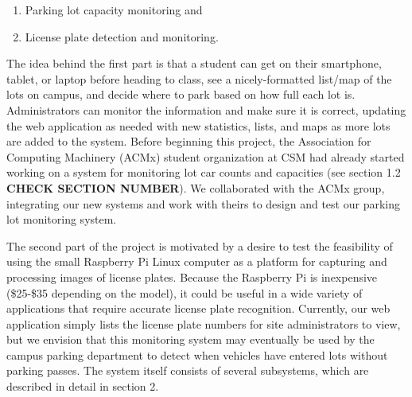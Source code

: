 \documentclass[11pt, oneside, fullpage, doublespace]{article}
\begin{document}
\begin{enumerate}
\item Parking lot capacity monitoring and
\item License plate detection and monitoring.
\end{enumerate}

The idea behind the first part is that a student can get on their smartphone, tablet, or laptop before heading to class, see a nicely-formatted list/map of the lots on campus, and decide where to park based on how full each lot is. Administrators can monitor the information and make sure it is correct, updating the web application as needed with new statistics, lists, and maps as more lots are added to the system. Before beginning this project, the Association for Computing Machinery (ACMx) student organization at CSM had already started working on a system for monitoring lot car counts and capacities (see section 1.2\textbf{\color{red} CHECK SECTION NUMBER}). We collaborated with the ACMx group, integrating our new systems and work with theirs to design and test our parking lot monitoring system.

The second part of the project is motivated by a desire to test the feasibility of using the small Raspberry Pi Linux computer as a platform for capturing and processing images of license plates. Because the Raspberry Pi is inexpensive (\$25-\$35 depending on the model), it could be useful in a wide variety of applications that require accurate license plate recognition. Currently, our web application simply lists the license plate numbers for site administrators to view, but we envision that this monitoring system may eventually be used by the campus parking department to detect when vehicles have entered lots without parking passes. The system itself consists of several subsystems, which are described in detail in section 2.
\end{document}
